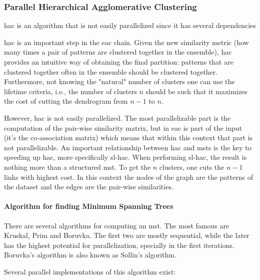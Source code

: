 \subsubsection{Parallel Hierarchical Agglomerative Clustering}


\gls{hac} is an algorithm that is not easily parallelized since it has several dependencies 

\gls{hac} is an important step in the \gls{eac} chain. Given the new similarity metric (how many times a pair of patterns are clustered together in the ensemble), \gls{hac} provides an intuitive way of obtaining the final partition: patterns that are clustered together often in the ensemble should be clustered together. Furthermore, not knowing the "natural" number of clusters one can use the lifetime criteria, i.e., the number of clusters $n$ should be such that it maximizes the cost of cutting the dendrogram from $n-1$ to $n$.

However, \gls{hac} is not easily parallelized. The most parallelizable part is the computation of the pair-wise similarity matrix, but in \gls{eac} is part of the input (it's the co-association matrix) which means that within this context that part is not parallelizable.
An important relationship between \gls{hac} and \gls{mst}s is the key to speeding up \gls{hac}, more specifically \gls{sl-hac}.
When performing \gls{sl-hac}, the result is nothing more than a structured \gls{mst}. To get the $n$ clusters, one cuts the $n-1$ links with highest cost. In this context the nodes of the graph are the patterns of the dataset and the edges are the pair-wise similarities.

\paragraph{Algorithm for finding Minimum Spanning Trees}
There are several algorithms for computing an \gls{mst}. The most famous are Kruskal, Prim and Boruvka. The first two are mostly sequential, while the later has the highest potential for parallelization, specially in the first iterations.
Boruvka's algorithm is also known as Sollin's algorithm.

Several parallel implementations of this algorithm exist:


